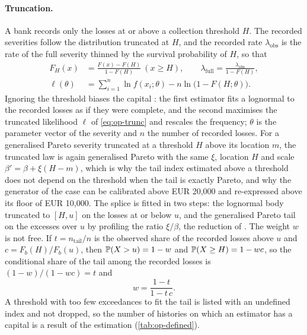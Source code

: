\paragraph{Truncation.} A bank records only the losses at or above a collection threshold $H$. The recorded severities follow the
distribution truncated at $H$, and the recorded rate $\lambda_{\mathrm{obs}}$ is the rate of the full severity thinned by the
survival probability of $H$, so that
\begin{equation}
\begin{aligned}
F_H(x)&=\frac{F(x)-F(H)}{1-F(H)}\ (x\ge H),\qquad \lambda_{\mathrm{full}}=\frac{\lambda_{\mathrm{obs}}}{1-F(H)},\\
\ell(\theta)&=\sum_{i=1}^{n}\ln f(x_i;\theta)-n\ln\bigl(1-F(H;\theta)\bigr).
\end{aligned}
\label{eq:op-trunc}
\end{equation}
Ignoring the threshold biases the capital \citep{oprisk:mignola2007,oprisk:cope2009}: the first estimator fits a lognormal
to the recorded losses as if they were complete, and the second maximises the truncated likelihood $\ell$ of \cref{eq:op-trunc} and
rescales the frequency; $\theta$ is the parameter vector of the severity and $n$ the number of recorded losses. For a generalised
Pareto severity truncated at a threshold $H$ above its location $m$, the truncated law is again generalised Pareto with the same
$\xi$, location $H$ and scale $\beta'=\beta+\xi(H-m)$, which is why the tail index estimated above a threshold does not depend on
the threshold when the tail is exactly Pareto, and why the generator of the case can be calibrated above EUR 20,000 and
re-expressed above its floor of EUR 10,000. The splice is fitted in two steps: the lognormal body truncated to $[H,u]$ on the losses
at or below $u$, and the generalised Pareto tail on the excesses over $u$ by profiling the ratio $\xi/\beta$, the reduction of
\citet{oprisk:grimshaw1993}. The weight $w$ is not free. If $t=n_{\mathrm{tail}}/n$ is the observed share of the recorded losses
above $u$ and $c=F_b(H)/F_b(u)$, then $\mathbb{P}(X>u)=1-w$ and $\mathbb{P}(X\ge H)=1-wc$, so the conditional share of the tail among the recorded
losses is $(1-w)/(1-wc)=t$ and
\begin{equation}
w=\frac{1-t}{1-t\,c}.
\label{eq:op-weight}
\end{equation}
A threshold with too few exceedances to fit the tail is listed with an undefined index and not dropped, so the number of
histories on which an estimator has a capital is a result of the estimation (\cref{tab:op-defined}).

